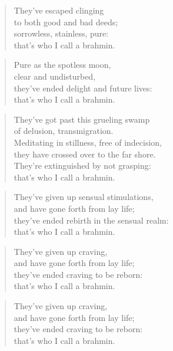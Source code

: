\documentclass[12pt,openany]{book}%
\begin{document}
\begin{verse}%
They’ve escaped clinging \\
to both good and bad deeds; \\
sorrowless, stainless, pure: \\
that’s who I call a brahmin. 

%
\end{verse}

\begin{verse}%
Pure as the spotless moon, \\
clear and undisturbed, \\
they’ve ended delight and future lives: \\
that’s who I call a brahmin. 

%
\end{verse}

\begin{verse}%
They’ve got past this grueling swamp \\
of delusion, transmigration. \\
Meditating in stillness, free of indecision, \\
they have crossed over to the far shore. \\
They’re extinguished by not grasping: \\
that’s who I call a brahmin. 

%
\end{verse}

\begin{verse}%
They’ve given up sensual stimulations, \\
and have gone forth from lay life; \\
they’ve ended rebirth in the sensual realm: \\
that’s who I call a brahmin. 

%
\end{verse}

\begin{verse}%
They’ve given up craving, \\
and have gone forth from lay life; \\
they’ve ended craving to be reborn: \\
that’s who I call a brahmin. 

%
\end{verse}

\begin{verse}%
They’ve given up craving, \\
and have gone forth from lay life; \\
they’ve ended craving to be reborn: \\
that’s who I call a brahmin. 

%
\end{verse}
\end{document}
